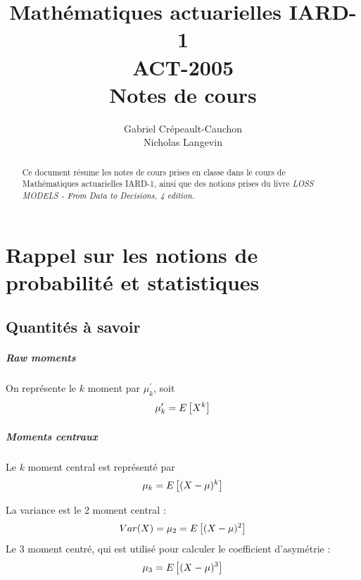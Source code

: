 \documentclass[12pt, french]{report}
\title{Mathématiques actuarielles IARD-1 \\
ACT-2005 \\
Notes de cours}
\author{Gabriel Crépeault-Cauchon \\
Nicholas Langevin}
\begin{document}
\maketitle

\tableofcontents


\begin{abstract}
Ce document résume les notes de cours prises en classe dans le cours de Mathématiques actuarielles IARD-1, ainsi que des notions prises du livre \textit{LOSS MODELS - From Data to Decisions, 4 edition}.
\end{abstract}

\chapter{Rappel sur les notions de probabilité et statistiques}
\section{Quantités à savoir}

\paragraph{\textit{Raw moments}}
On représente le $k$ moment par $\mu_k^\prime$, soit
\begin{equation}
\mu_k^\prime = E \left[ X^k \right] 
\end{equation}

\paragraph{Moments centraux} Le $k$ moment central est représenté par
\begin{equation}
\mu_k = E \left[ (X - \mu)^k \right]
\end{equation}

\begin{exemple}
La variance est le 2 moment central : 
\begin{align*}
Var(X) = \mu_2 =  E \left[ (X - \mu)^2 \right] \\
\end{align*}
Le 3 moment centré, qui est utilisé pour calculer le coefficient d'asymétrie : 
\begin{align*}
\mu_3 = E \left[ (X-\mu)^3 \right]
\end{align*}
\end{exemple}
\end{document}
